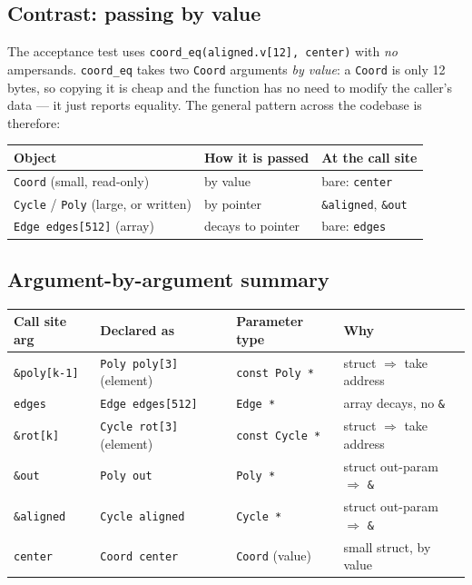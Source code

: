 \documentclass[10pt,a4paper]{article}
\let\polysubsection\subsection
\renewcommand\subsection{\needspace{0.12\textheight}\polysubsection}
\newcommand{\code}[1]{\texttt{\small #1}}
\begin{document}
\subsection{Contrast: passing by value}

The acceptance test uses \code{coord\_eq(aligned.v[12], center)} with
\emph{no} ampersands.  \code{coord\_eq} takes two \code{Coord} arguments
\emph{by value}: a \code{Coord} is only 12 bytes, so copying it is cheap and
the function has no need to modify the caller's data — it just reports
equality.  The general pattern across the codebase is therefore:

\begin{center}
\begin{tabular}{@{}lll@{}}
\toprule
\textbf{Object} & \textbf{How it is passed} & \textbf{At the call site} \\
\midrule
\code{Coord} (small, read-only) & by value          & bare: \code{center} \\
\code{Cycle} / \code{Poly} (large, or written) & by pointer & \code{\&aligned}, \code{\&out} \\
\code{Edge edges[512]} (array)  & decays to pointer & bare: \code{edges} \\
\bottomrule
\end{tabular}
\end{center}

\subsection{Argument-by-argument summary}

\begin{center}
\begin{tabular}{@{}llll@{}}
\toprule
\textbf{Call site arg} & \textbf{Declared as} & \textbf{Parameter type} & \textbf{Why} \\
\midrule
\code{\&poly[k-1]} & \code{Poly poly[3]} (element) & \code{const Poly *} & struct $\Rightarrow$ take address \\
\code{edges}       & \code{Edge edges[512]}        & \code{Edge *}       & array decays, no \code{\&} \\
\code{\&rot[k]}    & \code{Cycle rot[3]} (element) & \code{const Cycle *}& struct $\Rightarrow$ take address \\
\code{\&out}       & \code{Poly out}               & \code{Poly *}       & struct out-param $\Rightarrow$ \code{\&} \\
\code{\&aligned}   & \code{Cycle aligned}          & \code{Cycle *}      & struct out-param $\Rightarrow$ \code{\&} \\
\code{center}      & \code{Coord center}           & \code{Coord} (value)& small struct, by value \\
\bottomrule
\end{tabular}
\end{center}
\end{document}
